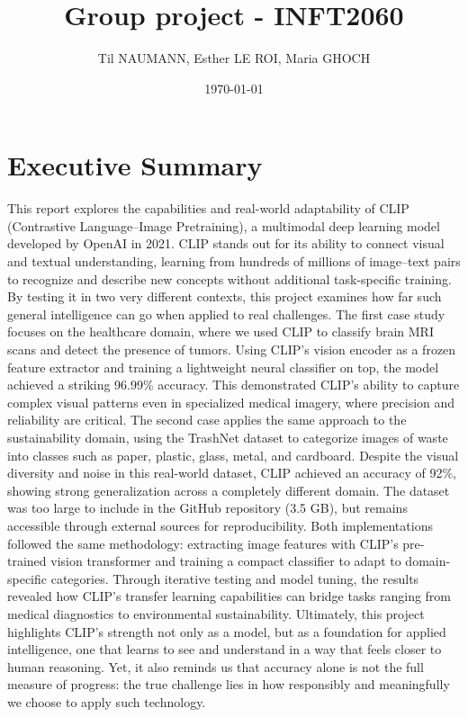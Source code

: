 \documentclass[12pt]{article}
\title{Group project - INFT2060}
\author{Til NAUMANN, Esther LE ROI, Maria GHOCH}
\date{\today}
\begin{document}
\maketitle
\newpage

\tableofcontents
\newpage

\section*{Executive Summary}
This report explores the capabilities and real-world adaptability of CLIP (Contrastive Language–Image Pretraining), a multimodal deep learning model developed by OpenAI in 2021. CLIP stands out for its ability to connect visual and textual understanding, learning from hundreds of millions of image–text pairs to recognize and describe new concepts without additional task-specific training. By testing it in two very different contexts, this project examines how far such general intelligence can go when applied to real challenges.
The first case study focuses on the healthcare domain, where we used CLIP to classify brain MRI scans and detect the presence of tumors. Using CLIP’s vision encoder as a frozen feature extractor and training a lightweight neural classifier on top, the model achieved a striking 96.99\% accuracy. This demonstrated CLIP’s ability to capture complex visual patterns even in specialized medical imagery, where precision and reliability are critical.
The second case applies the same approach to the sustainability domain, using the TrashNet dataset to categorize images of waste into classes such as paper, plastic, glass, metal, and cardboard. Despite the visual diversity and noise in this real-world dataset, CLIP achieved an accuracy of 92\%, showing strong generalization across a completely different domain. The dataset was too large to include in the GitHub repository (3.5 GB), but remains accessible through external sources for reproducibility.
Both implementations followed the same methodology: extracting image features with CLIP’s pre-trained vision transformer and training a compact classifier to adapt to domain-specific categories. Through iterative testing and model tuning, the results revealed how CLIP’s transfer learning capabilities can bridge tasks ranging from medical diagnostics to environmental sustainability.
Ultimately, this project highlights CLIP’s strength not only as a model, but as a foundation for applied intelligence, one that learns to see and understand in a way that feels closer to human reasoning. Yet, it also reminds us that accuracy alone is not the full measure of progress: the true challenge lies in how responsibly and meaningfully we choose to apply such technology.
\newpage
\end{document}
